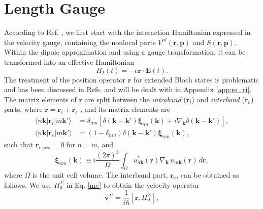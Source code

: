 
\section{Length Gauge}\label{longi}

According to Ref. \cite{ismailPRL01}, we first start with the interaction
Hamiltonian expressed in the velocity gauge, containing the nonlocal parts
$V^{nl}(\mathbf{r},\mathbf{p})$ and $S (\mathbf{r},\mathbf{p})$. Within the
dipole approximation and using a gauge transformation, it can be transformed
into an effective Hamiltonian \cite{valerie}
\begin{equation}
H_{I}(t)=-e\mathbf{r}\cdot \mathbf{E}(t).
\label{rde}
\end{equation}
The treatment of the position operator $\mathbf{r}$ for extended Bloch states is
problematic and has been discussed in Refs. \cite{adamsJCP53, blountSSP62} and
will be dealt with in Appendix \ref{app:re_ri}. The matrix elements of
$\mathbf{r}$ are split between the \emph{intraband} ($\mathbf{r}_{i}$) and
\emph{interband} ($\mathbf{r}_{e}$) parts, where $\mathbf{r} = \mathbf{r}_{i} +
\mathbf{r}_{e}$ \cite{adamsJCP53, blountSSP62}, and its matrix elements are
\cite{aversaPRB95}
\begin{align}\label{rnminn}
\langle n\mathbf{k}\vert \mathbf{r}_{i} |m\mathbf{k}'\rangle 
&= \delta_{nm}
\left[
  \delta(\mathbf{k} - \mathbf{k}')\boldsymbol{\xi}_{nn}(\mathbf{k})
+ i\nabla_{\mathbf{k}}\delta(\mathbf{k} - \mathbf{k}')
\right],\\
\langle n\mathbf{k}| \mathbf{r}_{e} |m\mathbf{k}'\rangle 
&= (1- \delta_{nm})\delta(\mathbf{k}-\mathbf{k}')
   \boldsymbol{\xi}_{nm}(\mathbf{k}),\label{rnmenn}
\end{align}
such that $\mathbf{r}_{e,nm}=0$ for $n=m$, and
\begin{equation}\label{zetann}
\boldsymbol{\xi}_{nm}(\mathbf{k})
\equiv i\frac{(2\pi)^3}{\Omega}
\int_{\Omega}u^{*}_{n\mathbf{k}}(\mathbf{r})
\nabla_{\mathbf{k}}\,u_{m\mathbf{k}}(\mathbf{r})
\,d\mathbf{r},
\end{equation}
where $\Omega$ is the unit cell volume. The interband part, $\mathbf{r}_{e}$,
can be obtained as follows. We use $H^{\Sigma}_{0}$ in Eq. \eqref{mv} to obtain
the velocity operator
\begin{equation}\label{vop}
\mathbf{v}^{\Sigma}
= \frac{1}{i\hbar}
\left[\mathbf{r},H^{\Sigma}_{0}\right],
\end{equation}
